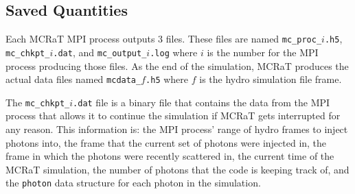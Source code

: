 \documentclass[12pt,a4paper]{article}
\begin{document}
\subsection{Saved Quantities} 

Each MCRaT MPI process outputs 3 files. These files are named \texttt{mc\_proc\_$i$.h5}, \texttt{mc\_chkpt\_$i$.dat}, and \texttt{mc\_output\_$i$.log} where $i$ is the number for the MPI process producing those files. As the end of the simulation, MCRaT produces the actual data files named \texttt{mcdata\_$f$.h5} where $f$ is the hydro simulation file frame.

The \texttt{mc\_chkpt\_$i$.dat} file is a binary file that contains the data from the MPI process that allows it to continue the simulation if MCRaT gets interrupted for any reason. This information is: the MPI process' range of hydro frames to inject photons into, the frame that the current set of photons were injected in, the frame in which the photons were recently scattered in, the current time of the MCRaT simulation, the number of photons that the code is keeping track of, and the \texttt{photon} data structure for each photon in the simulation.
\end{document}
